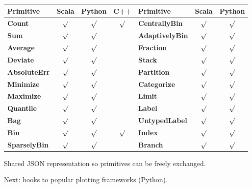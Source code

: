 \documentclass{beamer}
\begin{document}
\begin{frame}{}
\vfill
\begin{minipage}{\linewidth}
\renewcommand{\arraystretch}{1.2}
\begin{tabular}{l c c c | l c c}
Primitive & Scala & Python & C++ & Primitive & Scala & Python \\\hline
{\bf \scriptsize Count}       & $\surd$ & $\surd$ & $\surd$ & {\bf \scriptsize CentrallyBin}    & $\surd$ & $\surd$ \\
{\bf \scriptsize Sum}         & $\surd$ & $\surd$ &      & {\bf \scriptsize AdaptivelyBin}   & $\surd$ & $\surd$ \\
{\bf \scriptsize Average}     & $\surd$ & $\surd$ &      & {\bf \scriptsize Fraction}        & $\surd$ & $\surd$ \\    
{\bf \scriptsize Deviate}     & $\surd$ & $\surd$ &      & {\bf \scriptsize Stack}           & $\surd$ & $\surd$ \\
{\bf \scriptsize AbsoluteErr} & $\surd$ & $\surd$ &      & {\bf \scriptsize Partition}       & $\surd$ & $\surd$ \\
{\bf \scriptsize Minimize}    & $\surd$ & $\surd$ &      & {\bf \scriptsize Categorize}      & $\surd$ & $\surd$ \\
{\bf \scriptsize Maximize}    & $\surd$ & $\surd$ &      & {\bf \scriptsize Limit}           & $\surd$ & $\surd$ \\
{\bf \scriptsize Quantile}    & $\surd$ & $\surd$ &      & {\bf \scriptsize Label}           & $\surd$ & $\surd$ \\
{\bf \scriptsize Bag}         & $\surd$ & $\surd$ &      & {\bf \scriptsize UntypedLabel}    & $\surd$ & $\surd$ \\
{\bf \scriptsize Bin}         & $\surd$ & $\surd$ & $\surd$ & {\bf \scriptsize Index}           & $\surd$ & $\surd$ \\
{\bf \scriptsize SparselyBin} & $\surd$ & $\surd$ &      & {\bf \scriptsize Branch}          & $\surd$ & $\surd$ \\
\end{tabular}
\end{minipage}

\vspace{0.5 cm}
Shared JSON representation so primitives can be freely exchanged.

\vfill
Next: hooks to popular plotting frameworks (Python).
\end{frame}
\end{document}
